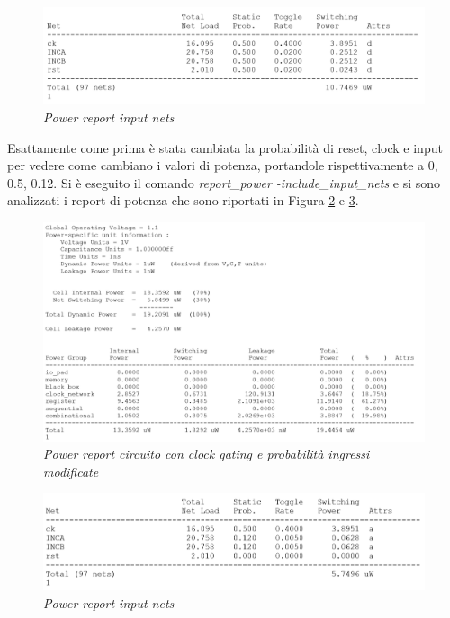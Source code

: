 \begin{figure}[!htb]
	\centering
	\includegraphics[scale=0.65]{immagini/3_8}
	\caption{\textit{Power report input nets}}
	\label{3_8}
\end{figure}
\newpage
Esattamente come prima è stata cambiata la probabilità di reset, clock e input per vedere come cambiano i valori di potenza, portandole rispettivamente a 0, 0.5, 0.12.
Si è eseguito il comando \textit{report\_power -include\_input\_nets} e si sono analizzati i report di potenza che sono riportati in Figura \ref{3_9} e \ref{3_10}.\\
\begin{figure}[!htb]
	\centering
	\includegraphics[scale=0.65]{immagini/3_9}
	\caption{\textit{Power report circuito con clock gating e probabilità ingressi modificate}}
	\label{3_9}
\end{figure}
\begin{figure}[!htb]
	\centering
	\includegraphics[scale=0.65]{immagini/3_10}
	\caption{\textit{Power report input nets}}
	\label{3_10}
\end{figure}
\newpage


